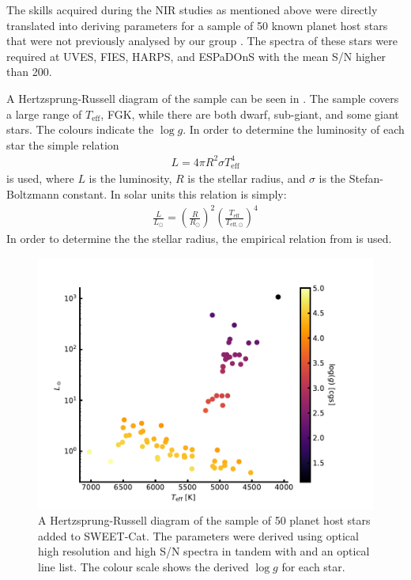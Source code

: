 The skills acquired during the NIR studies as mentioned above were directly translated into deriving
parameters for a sample of 50 known planet host stars that were not previously analysed by our group
\citep{Andreasen2017a}. The spectra of these stars were required at UVES, FIES, HARPS, and ESPaDOnS
with the mean S/N higher than 200.

A Hertzsprung-Russell diagram of the sample can be seen in . The sample covers a
large range of $T_\mathrm{eff}$, FGK, while there are both dwarf, sub-giant, and some giant stars.
The colours indicate the $\log g$. In order to determine the luminosity of each star the simple
relation
\begin{align*}
  L = 4\pi R^2 \sigma T^4_\mathrm{eff}
\end{align*}
is used, where $L$ is the luminosity, $R$ is the stellar radius, and $\sigma$ is the
Stefan-Boltzmann constant. In solar units this relation is simply:
\begin{align*}
  \frac{L}{L_\odot} = \left(\frac{R}{R_\odot}\right)^2 \left(\frac{T_\mathrm{eff}}{T_{\mathrm{eff},\odot}}\right)^4
\end{align*}
In order to determine the the stellar radius, the empirical relation from \citet{Torres2010} is
used.

\begin{figure}[htpb!]
    \centering
    \includegraphics[width=1.0\linewidth]{figures/HR.pdf}
    \caption{A Hertzsprung-Russell diagram of the sample of 50 planet host stars added to SWEET-Cat.
             The parameters were derived using optical high resolution and high S/N spectra in
             tandem with \FASMA and an optical line list. The colour scale shows the derived
             $\log g$ for each star.}
    \label{fig:sweetcat}
\end{figure}

